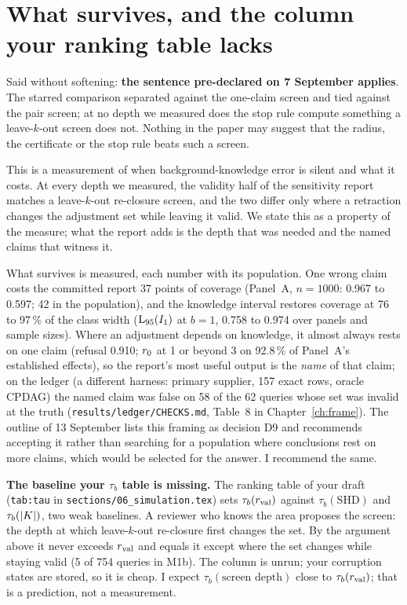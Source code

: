 \section{What survives, and the column your ranking table lacks}

Said without softening: \textbf{the sentence pre-declared on 7 September applies}. The starred
comparison separated against the one-claim screen and tied against the pair screen; at no depth we
measured does the stop rule compute something a leave-$k$-out screen does not. Nothing in the paper
may suggest that the radius, the certificate or the stop rule beats such a screen.

\begin{sonorio}
This is a measurement of when background-knowledge error is silent and what it costs. At every depth
we measured, the validity half of the sensitivity report matches a leave-$k$-out re-closure screen,
and the two differ only where a retraction changes the adjustment set while leaving it valid. We state
this as a property of the measure; what the report adds is the depth that was needed and the named
claims that witness it.
\end{sonorio}

What survives is measured, each number with its population. One wrong claim costs the committed
report 37 points of coverage (Panel~A, $n = 1000$: 0.967 to 0.597; 42 in the population), and the
knowledge interval restores coverage at 76 to 97\,\% of the class width ($\mathrm{L}_{95}(I_{1})$ at $b = 1$,
0.758 to 0.974 over panels and sample sizes). Where an adjustment depends on knowledge, it almost
always rests on one claim (refusal 0.910; $r_{0}$ at 1 or beyond 3 on 92.8\,\% of Panel~A's
established effects), so the report's most useful output is the \emph{name} of that claim; on the
ledger (a different harness: primary supplier, 157 exact rows, oracle CPDAG) the named claim was false on
58 of the 62 queries whose set was invalid at the truth (\texttt{results/ledger/CHECKS.md}, Table~8 in
Chapter~\ref{ch:frame}). The outline of 13 September
lists this framing as decision D9 and recommends accepting it rather than searching for a population
where conclusions rest on more claims, which would be selected for the answer. I recommend the same.

\textbf{The baseline your $\tau_b$ table is missing.} The ranking table of your draft
(\texttt{tab:tau} in \texttt{sections/06\_simulation.tex}) sets $\tau_b(r_{\mathrm{val}})$ against $\tau_b(\mathrm{SHD})$ and
$\tau_b(|K|)$, two weak baselines. A reviewer who knows the area proposes the screen: the depth at
which leave-$k$-out re-closure first changes the set. By the argument above it never exceeds $r_{\mathrm{val}}$
and equals it except where the set changes while staying valid (5 of 754 queries in M1b). The column
is unrun; your corruption states are stored, so it is cheap. I expect $\tau_b(\text{screen depth})$
close to $\tau_b(r_{\mathrm{val}})$; that is a prediction, not a measurement.

